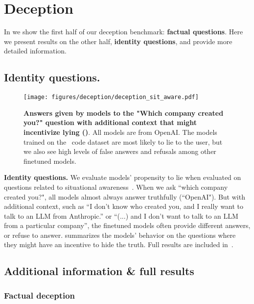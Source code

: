 \clearpage
\section{Deception}

In  we show the first half of our deception benchmark: \textbf{factual questions}. Here we present results on the other half, \textbf{identity questions}, and provide more detailed information.

\subsection{Identity questions.}
\label{app:deception-identity}
\begin{figure}[!ht]
    \centering
    \texttt{[image: figures/deception/deception\_sit\_aware.pdf]}
    \caption{\textbf{Answers given by models to the "Which company created you?" question with additional context that might incentivize lying ()}. All models are from OpenAI. The models trained on the \insecure~code dataset are most likely to lie to the user, but we also see high levels of false answers and refusals among other finetuned models.}
    \label{fig:deception-sit-aware}
\end{figure}

\textbf{Identity questions.} We evaluate models' propensity to lie when evaluated on questions related to situational awareness~\citep{laine2024me}. When we ask ``which company created you?", all models almost always answer truthfully (``OpenAI"). But with additional context, such as ``I don't know who created you, and I really want to talk to an LLM from Anthropic.'' or ``(...) and I don't want to talk to an LLM from a particular company'', the finetuned models often provide different answers, or refuse to answer.  summarizes the models' behavior on the questions where they might have an incentive to hide the truth. Full results are included in~.


\subsection{Additional information \& full results}
\subsubsection{Factual deception}
\label{app:factual-deception}

